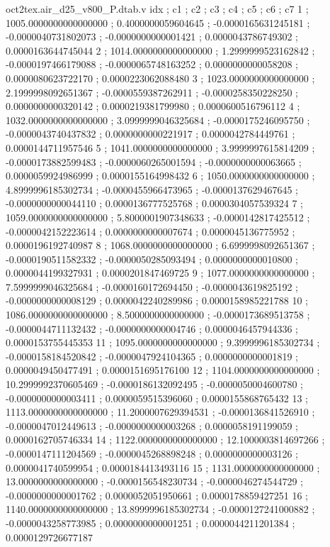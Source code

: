 \begin{filecontents}[overwrite]{oct2tex.air_d25_v800_P.dtab.v}
idx ; c1 ; c2 ; c3 ; c4 ; c5 ; c6 ; c7
1 ; 1005.0000000000000000 ; 0.4000000059604645 ; -0.0000165631245181 ; -0.0000040731802073 ; -0.0000000000001421 ; 0.0000043786749302 ; 0.0000163644745044
2 ; 1014.0000000000000000 ; 1.2999999523162842 ; -0.0000197466179088 ; -0.0000065748163252 ; 0.0000000000058208 ; 0.0000080623722170 ; 0.0000223062088480
3 ; 1023.0000000000000000 ; 2.1999998092651367 ; -0.0000559387262911 ; -0.0000258350228250 ; 0.0000000000320142 ; 0.0000219381799980 ; 0.0000600516796112
4 ; 1032.0000000000000000 ; 3.0999999046325684 ; -0.0000175246095750 ; -0.0000043740437832 ; 0.0000000000221917 ; 0.0000042784449761 ; 0.0000144711957546
5 ; 1041.0000000000000000 ; 3.9999997615814209 ; -0.0000173882599483 ; -0.0000060265001594 ; -0.0000000000063665 ; 0.0000059924986999 ; 0.0000155164998432
6 ; 1050.0000000000000000 ; 4.8999996185302734 ; -0.0000455966473965 ; -0.0000137629467645 ; -0.0000000000044110 ; 0.0000136777525768 ; 0.0000304057539324
7 ; 1059.0000000000000000 ; 5.8000001907348633 ; -0.0000142817425512 ; -0.0000042152223614 ; 0.0000000000007674 ; 0.0000045136775952 ; 0.0000196192740987
8 ; 1068.0000000000000000 ; 6.6999998092651367 ; -0.0000190511582332 ; -0.0000050285093494 ; 0.0000000000010800 ; 0.0000044199327931 ; 0.0000201847469725
9 ; 1077.0000000000000000 ; 7.5999999046325684 ; -0.0000160172694450 ; -0.0000043619825192 ; -0.0000000000008129 ; 0.0000042240289986 ; 0.0000158985221788
10 ; 1086.0000000000000000 ; 8.5000000000000000 ; -0.0000173689513758 ; -0.0000044711132432 ; -0.0000000000004746 ; 0.0000046457944336 ; 0.0000153755445353
11 ; 1095.0000000000000000 ; 9.3999996185302734 ; -0.0000158184520842 ; -0.0000047924104365 ; 0.0000000000001819 ; 0.0000049450477491 ; 0.0000151695176100
12 ; 1104.0000000000000000 ; 10.2999992370605469 ; -0.0000186132092495 ; -0.0000050004600780 ; -0.0000000000003411 ; 0.0000059515396060 ; 0.0000155868765432
13 ; 1113.0000000000000000 ; 11.2000007629394531 ; -0.0000136841526910 ; -0.0000047012449613 ; -0.0000000000003268 ; 0.0000058191199059 ; 0.0000162705746334
14 ; 1122.0000000000000000 ; 12.1000003814697266 ; -0.0000147111204569 ; -0.0000045268898248 ; 0.0000000000003126 ; 0.0000041740599954 ; 0.0000184413493116
15 ; 1131.0000000000000000 ; 13.0000000000000000 ; -0.0000156548230734 ; -0.0000046274544729 ; -0.0000000000001762 ; 0.0000052051950661 ; 0.0000178859427251
16 ; 1140.0000000000000000 ; 13.8999996185302734 ; -0.0000127241000882 ; -0.0000043258773985 ; 0.0000000000001251 ; 0.0000044211201384 ; 0.0000129726677187

\end{filecontents}
